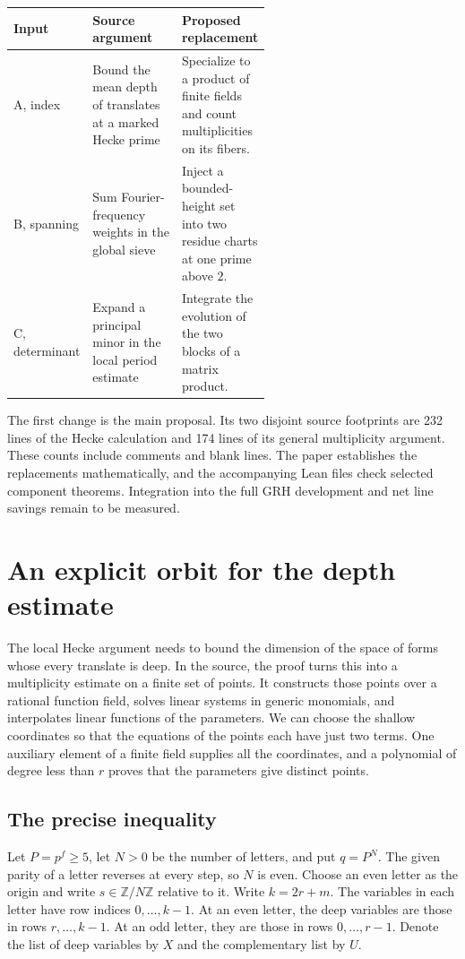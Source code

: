 \documentclass[11pt,letterpaper]{article}
\begin{document}
\begin{center}\small
\begin{tabularx}{\linewidth}{@{}p{0.14\linewidth}p{0.43\linewidth}X@{}}
\toprule
Input & Source argument & Proposed replacement \\ \midrule
A, index & Bound the mean depth of translates at a marked Hecke prime & Specialize to a product of finite fields and count multiplicities on its fibers. \\
B, spanning & Sum Fourier-frequency weights in the global sieve & Inject a bounded-height set into two residue charts at one prime above $2$. \\
C, determinant & Expand a principal minor in the local period estimate & Integrate the evolution of the two blocks of a matrix product. \\ \bottomrule
\end{tabularx}\end{center}
The first change is the main proposal. Its two disjoint source footprints are 232 lines of the Hecke calculation and 174 lines of its general multiplicity argument. These counts include comments and blank lines. The paper establishes the replacements mathematically, and the accompanying Lean files check selected component theorems. Integration into the full GRH development and net line savings remain to be measured.
\section{An explicit orbit for the depth estimate}
\label{sec:depth-orbit}

The local Hecke argument needs to bound the dimension of the space of forms whose every translate is deep. In the source, the proof turns this into a multiplicity estimate on a finite set of points. It constructs those points over a rational function field, solves linear systems in generic monomials, and interpolates linear functions of the parameters. We can choose the shallow coordinates so that the equations of the points each have just two terms. One auxiliary element of a finite field supplies all the coordinates, and a polynomial of degree less than $r$ proves that the parameters give distinct points.

\subsection{The precise inequality}

Let $P=p^f\geq 5$, let $N>0$ be the number of letters, and put $q=P^N$. The given parity of a letter reverses at every step, so $N$ is even. Choose an even letter as the origin and write $s\in\mathbb Z/N\mathbb Z$ relative to it. Write $k=2r+m$. The variables in each letter have row indices $0,\ldots,k-1$. At an even letter, the deep variables are those in rows $r,\ldots,k-1$. At an odd letter, they are those in rows $0,\ldots,r-1$. Denote the list of deep variables by $X$ and the complementary list by $U$.
\end{document}

